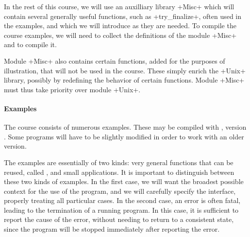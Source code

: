 In the rest of this course, we will use an auxilliary library \ml+Misc+
which will contain several generally useful functions, such as
\ml+try_finalize+, often used in the examples, and which we will
introduce as they are needed. To compile the course examples, we will
need to collect the definitions of the module \ml+Misc+ and to
compile it.

Module \ml+Misc+ also contains certain functions, added for the
purposes of illustration, that will not be used in the course. These
simply enrich the \ml+Unix+ library, possibly by redefining the
behavior of certain functions.  Module \ml+Misc+ must thus take
priority over module \ml+Unix+.

\paragraph{Examples}

The course consists of numerous examples. These may be compiled with 
{\ocaml}, version {\ocamlversion}.  Some programs will have to be
slightly modified in order to work with an older version. 

The examples are essentially of two kinds: very general functions that can
be reused, called , and small
applications. It is important to distinguish between these two kinds
of examples. In the first case, we will want the broadest possible context
for the use of the program, and we will carefully specify the
interface, properly treating all particular cases.  In the second
case, an error is often fatal, leading to the termination of a running program. In this
case, it is sufficient to report the cause of the error, without
needing to return to a consistent state, since the program will be
stopped immediately after reporting the error.
